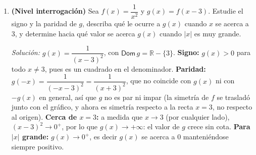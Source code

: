 \documentclass[11pt]{article}
\begin{document}
\begin{enumerate}[label=\arabic*.]
\textit{Solución:} Escribiendo $2x-4=2(x-2)$: $g(x) = \dfrac{3}{2(x-2)}+1$, que combinando sobre
un denominador común es $g(x) = \dfrac{3+2(x-2)}{2(x-2)} = \dfrac{2x-1}{2x-4}$. Transformaciones,
en orden: (a) compresión horizontal en factor $2$ (el ancho se divide por $2$); (b) traslación
horizontal $2$ hacia la derecha; (c) dilatación vertical en factor $3$; (d) traslación vertical
$1$ hacia arriba.

\item \textbf{(Nivel interrogación)} Sea $f(x) = \dfrac{1}{x^2}$ y $g(x) = f(x-3)$. Estudie el
signo y la paridad de $g$, describa qué le ocurre a $g(x)$ cuando $x$ se acerca a $3$, y determine
hacia qué valor se acerca $g(x)$ cuando $|x|$ es muy grande.

\textit{Solución:} $g(x) = \dfrac{1}{(x-3)^2}$, con $\mathsf{Dom}\,g=\mathbb{R}-\{3\}$.
\textbf{Signo:} $g(x)>0$ para todo $x\neq3$, pues es un cuadrado en el denominador. \textbf{Paridad:}
$g(-x) = \dfrac{1}{(-x-3)^2} = \dfrac{1}{(x+3)^2}$, que no coincide con $g(x)$ ni con $-g(x)$ en
general, así que $g$ no es par ni impar (la simetría de $f$ se trasladó junto con el gráfico, y
ahora es simetría respecto a la recta $x=3$, no respecto al origen). \textbf{Cerca de $x=3$:} a
medida que $x\to3$ (por cualquier lado), $(x-3)^2\to0^+$, por lo que $g(x)\to+\infty$: el valor de
$g$ crece sin cota. \textbf{Para $|x|$ grande:} $g(x)\to0^+$, es decir $g(x)$ se acerca a $0$
manteniéndose siempre positivo.

\end{enumerate}
\end{document}
